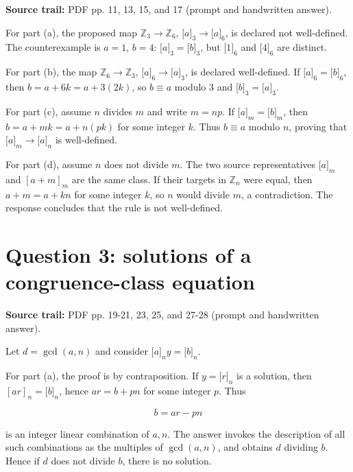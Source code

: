 \textbf{Source trail:} PDF pp. 11, 13, 15, and 17 (prompt and handwritten answer).

For part (a), the proposed map \(\mathbb{Z}_{3}\rightarrow\mathbb{Z}_{6}\), \(\lbrack a\rbrack_{3}\rightarrow\lbrack a\rbrack_{6}\), is declared not well-defined. The counterexample is \(a = 1\), \(b = 4\): \(\lbrack a\rbrack_{3} = \lbrack b\rbrack_{3}\), but \(\lbrack 1\rbrack_{6}\) and \(\lbrack 4\rbrack_{6}\) are distinct.

For part (b), the map \(\mathbb{Z}_{6}\rightarrow\mathbb{Z}_{3}\), \(\lbrack a\rbrack_{6}\rightarrow\lbrack a\rbrack_{3}\), is declared well-defined. If \(\lbrack a\rbrack_{6} = \lbrack b\rbrack_{6}\), then \(b = a + 6k = a + 3\left( {2k} \right)\), so \(b \equiv a\) modulo \(3\) and \(\lbrack b\rbrack_{3} = \lbrack a\rbrack_{3}\).

For part (c), assume \(n\) divides \(m\) and write \(m = np\). If \(\lbrack a\rbrack_{m} = \lbrack b\rbrack_{m}\), then \(b = a + mk = a + n\left( {pk} \right)\) for some integer \(k\). Thus \(b \equiv a\) modulo \(n\), proving that \(\lbrack a\rbrack_{m}\rightarrow\lbrack a\rbrack_{n}\) is well-defined.

For part (d), assume \(n\) does not divide \(m\). The two source representatives \(\lbrack a\rbrack_{m}\) and \(\left\lbrack {a + m} \right\rbrack_{m}\) are the same class. If their targets in \(\mathbb{Z}_{n}\) were equal, then \(a + m = a + kn\) for some integer \(k\), so \(n\) would divide \(m\), a contradiction. The response concludes that the rule is not well-defined.

\section{Question 3: solutions of a congruence-class equation}

\textbf{Source trail:} PDF pp. 19-21, 23, 25, and 27-28 (prompt and handwritten answer).

Let \(d = \gcd\left( {a,n} \right)\) and consider \(\lbrack a\rbrack_{n}y = \lbrack b\rbrack_{n}\).

For part (a), the proof is by contraposition. If \(y = \lbrack r\rbrack_{n}\) is a solution, then \(\left\lbrack {ar} \right\rbrack_{n} = \lbrack b\rbrack_{n}\), hence \(ar = b + pn\) for some integer \(p\). Thus

\[b = ar - pn\]

is an integer linear combination of \(a,n\). The answer invokes the description of all such combinations as the multiples of \(\gcd\left( {a,n} \right)\), and obtains \(d\) dividing \(b\). Hence if \(d\) does not divide \(b\), there is no solution.

